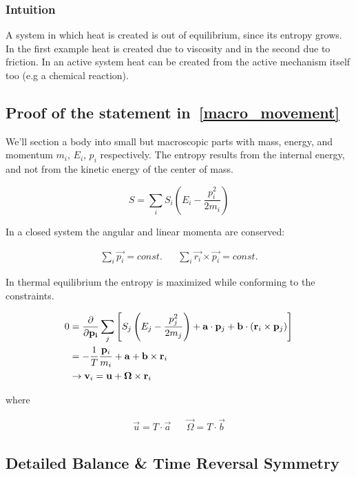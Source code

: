 \subsubsection{Intuition}

A system in which heat is created is out of equilibrium, since its entropy grows. In the first example heat is created due to viscosity and in the second due to friction. In an active system heat can be created from the active mechanism itself too (e.g a chemical reaction).

\subsection{Proof of the statement in~\ref{macro_movement}}

We'll section a body into small but macroscopic parts with mass, energy, and momentum \(m_i\), \(E_i\), \(p_i\) respectively. The entropy results from the internal energy, and not from the kinetic energy of the center of mass.

\begin{equation}
	S = \sum\limits_i S_i(E_i-\frac{p_i^2}{2m_i})
\end{equation}

In a closed system the angular and linear momenta are conserved:

\begin{align}
	\sum\limits_i \vec{p_i} = const. && \sum\limits_i \vec{r_i} \times \vec{p_i} = const.
\end{align}

In thermal equilibrium the entropy is maximized while conforming to the constraints.

\begin{align}
	0 &= \diffp*{}{\vec{p_i}}\sum\limits_j \left[S_j\left(E_j-\frac{p_j^2}{2m_j}\right)+\vec a \cdot \vec p_j + \vec b \cdot \left(\vec r_i\times \vec p_j\right)\right]\\
	&= -\frac{1}{T}\frac{\vec p_i}{m_i}+\vec a + \vec b \times \vec r_i\\
	&\rightarrow \vec v_i = \vec u + \vec\Omega \times \vec r_i
\end{align}

where

\begin{align}
	\vec u = T \cdot \vec a && \vec \Omega = T \cdot \vec b
\end{align}

\subsection{Detailed Balance \& Time Reversal Symmetry}

